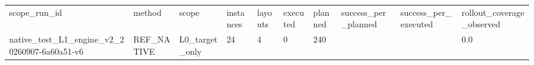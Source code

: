 \begin{tabular}{llllllllll}
scope\_run\_id & method & scope & instances & layouts & executed & planned & success\_per\_planned & success\_per\_executed & rollout\_coverage\_observed \\
native\_test\_L1\_engine\_v2\_20260907-6a60a51-v6 & REF\_NATIVE & L0\_target\_only & 24 & 4 & 0 & 240 &  &  & 0.0 \\
\end{tabular}
